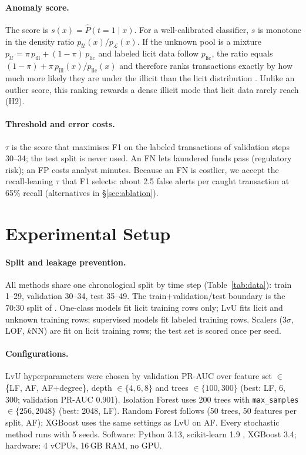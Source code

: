 \documentclass[11pt]{article}
\newcommand{\ours}{LvU}
\begin{document}
\paragraph{Anomaly score.}
The score is $s(x)=\hat{P}(t{=}1\mid x)$.
For a well-calibrated classifier, $s$ is monotone in the density ratio $p_{\mathcal{U}}(x)/p_{\mathcal{L}}(x)$.
If the unknown pool is a mixture $p_{\mathcal{U}}=\pi\,p_{\text{ill}}+(1-\pi)\,p_{\text{lic}}$ and labeled licit data follow $p_{\text{lic}}$, the ratio equals $(1-\pi)+\pi\,p_{\text{ill}}(x)/p_{\text{lic}}(x)$ and therefore ranks transactions exactly by how much more likely they are under the illicit than the licit distribution \citep{elkan2008pu}.
Unlike an outlier score, this ranking rewards a dense illicit mode that licit data rarely reach (H2).

\paragraph{Threshold and error costs.}
$\tau$ is the score that maximises F1 on the labeled transactions of validation steps 30--34; the test split is never used.
An FN lets laundered funds pass (regulatory risk); an FP costs analyst minutes.
Because an FN is costlier, we accept the recall-leaning $\tau$ that F1 selects: about 2.5 false alerts per caught transaction at 65\% recall (alternatives in \S\ref{sec:ablation}).

\section{Experimental Setup}
\label{sec:setup}

\paragraph{Split and leakage prevention.}
All methods share one chronological split by time step (Table~\ref{tab:data}): train 1--29, validation 30--34, test 35--49.
The train+validation/test boundary is the 70:30 split of \citet{weber2019aml}.
One-class models fit licit training rows only; \ours{} fits licit and unknown training rows; supervised models fit labeled training rows.
Scalers (3$\sigma$, LOF, $k$NN) are fit on licit training rows; the test set is scored once per seed.

\paragraph{Configurations.}
\ours{} hyperparameters were chosen by validation PR-AUC over feature set $\in$\{LF, AF, AF+degree\}, depth $\in\{4,6,8\}$ and trees $\in\{100,300\}$ (best: LF, 6, 300; validation PR-AUC 0.901).
Isolation Forest uses 200 trees with \texttt{max\_samples} $\in\{256,2048\}$ (best: 2048, LF).
Random Forest follows \citet{weber2019aml} (50 trees, 50 features per split, AF); XGBoost uses the same settings as \ours{} on AF.
Every stochastic method runs with 5 seeds.
Software: Python 3.13, scikit-learn 1.9 \citep{pedregosa2011sklearn}, XGBoost 3.4; hardware: 4 vCPUs, 16\,GB RAM, no GPU.
\end{document}
